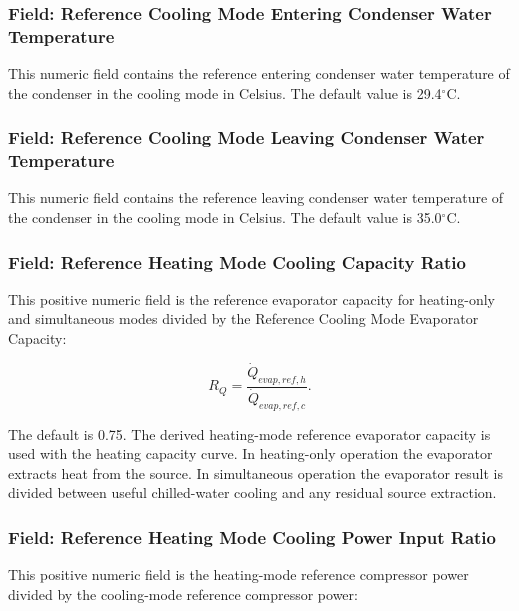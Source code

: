 \subsubsection{Field: Reference Cooling Mode Entering Condenser Water Temperature}\label{field-reference-cooling-mode-entering-condenser-water-temperature}

This numeric field contains the reference entering condenser water temperature of the condenser in the cooling mode in Celsius. The default value is 29.4$^\circ$C.

\subsubsection{Field: Reference Cooling Mode Leaving Condenser Water Temperature}\label{field-reference-cooling-mode-leaving-condenser-water-temperature}

This numeric field contains the reference leaving condenser water temperature of the condenser in the cooling mode in Celsius. The default value is 35.0$^\circ$C.

\subsubsection{Field: Reference Heating Mode Cooling Capacity Ratio}\label{field-reference-heating-mode-cooling-capacity-ratio}

This positive numeric field is the reference evaporator capacity for heating-only and simultaneous modes divided by the Reference Cooling Mode Evaporator Capacity:

\begin{equation}
R_Q=\frac{\dot Q_{evap,ref,h}}{\dot Q_{evap,ref,c}}.
\end{equation}

The default is 0.75. The derived heating-mode reference evaporator capacity is used with the heating capacity curve. In heating-only operation the evaporator extracts heat from the source. In simultaneous operation the evaporator result is divided between useful chilled-water cooling and any residual source extraction.

\subsubsection{Field: Reference Heating Mode Cooling Power Input Ratio}\label{field-reference-heating-mode-cooling-power-ratio}

This positive numeric field is the heating-mode reference compressor power divided by the cooling-mode reference compressor power:

